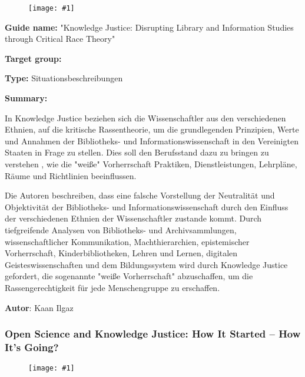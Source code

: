 \documentclass{article}
\newlength{\imgwidth}
\newcommand\scaledgraphics[2]{%
                
\settowidth{\imgwidth}{\texttt{[image: \#1]}}%
                
\setlength{\imgwidth}{\minof{\imgwidth}{#2\textwidth}}%
                
\texttt{[image: \#1]}%
                
}
\begin{document}
\begin{center}
\begin{figure}
\scaledgraphics{dcc1d35b-4186-4b50-a5a6-cf54422a8064.jpeg}{0.5}
\label{F29320001}
\end{figure}


\end{center}





\textbf{Guide name:} "Knowledge Justice: Disrupting Library and Information Studies through Critical Race Theory" \autocite{leung_knowledge_2021}


\textbf{Target group:}


\textbf{Type:} Situationsbeschreibungen


\textbf{Summary:}

In Knowledge Justice beziehen sich die Wissenschaftler aus den verschiedenen Ethnien, auf die kritische Rassentheorie, um die grundlegenden Prinzipien, Werte und Annahmen der Bibliotheks- und Informationswissenschaft in den Vereinigten Staaten in Frage zu stellen. Dies soll den Berufsstand dazu zu bringen zu verstehen , wie die "weiße" Vorherrschaft Praktiken, Dienstleistungen, Lehrpläne, Räume und Richtlinien beeinflussen.


Die Autoren beschreiben, dass eine falsche Vorstellung der Neutralität und Objektivität der Bibliotheks- und Informationswissenschaft durch den Einfluss der verschiedenen Ethnien der Wissenschaftler zustande kommt. Durch tiefgreifende Analysen von Bibliotheks- und Archivsammlungen, wissenschaftlicher Kommunikation, Machthierarchien, epistemischer Vorherrschaft, Kinderbibliotheken, Lehren und Lernen, digitalen Geisteswissenschaften und dem Bildungssystem wird durch Knowledge Justice gefordert, die sogenannte "weiße Vorherrschaft" abzuschaffen, um die Rassengerechtigkeit für jede Menschengruppe zu erschaffen. 


\textbf{Autor}: Kaan Ilgaz


\subsubsection{Open Science and Knowledge Justice: How It Started – How It’s Going?}\label{H480694}


\begin{figure}
\scaledgraphics{e590694e-3a8f-4a2f-801f-704d7d8edbc0.png}{1}
\label{F3873651}
\end{figure}
\end{document}

